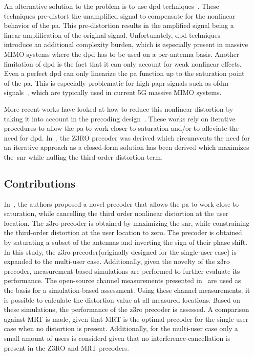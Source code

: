 \documentclass[conference]{IEEEtran}
\newcommand{\update}[1]{{#1}}
\newcommand{\zero}[0]{\gls{z3ro}\xspace}
\newcommand{\zerop}[0]{\zero precoder\xspace}
\begin{document}
An alternative solution to the problem is to use \gls{dpd} techniques~\cite{pa_for_wireless}. These techniques pre-distort the unamplified signal to compensate for the nonlinear behavior of the \gls{pa}. This pre-distortion results in the amplified signal being a linear amplification of the original signal. Unfortunately, \gls{dpd} techniques introduce an additional complexity burden, which is especially present in massive MIMO systems where the \gls{dpd} has to be used on a per-antenna basis. Another limitation of \gls{dpd} is the fact that it can only account for weak nonlinear effects. Even a perfect \gls{dpd} can only linearize the \gls{pa} function up to the saturation point of the \gls{pa}. This is especially problematic for high \gls{papr} signals such as \gls{ofdm} signals~\cite{ofdm_papr}, which are typically used in current 5G massive MIMO systems. 

\update{More recent works have looked at how to reduce this nonlinear distortion by taking it into account in the precoding design~\cite{distortion-aware, distortion-cancellation, efficient_precoding_undr_pa_nonlins}. These works rely on iterative procedures to allow the \gls{pa} to work closer to saturation and/or to alleviate the need for \gls{dpd}. In~\cite{z3ro}, the Z3RO precoder was derived which circumvents the need for an iterative approach as a closed-form solution has been derived which maximizes the~\gls{snr} while nulling the third-order distortion term.}

\subsection{Contributions}
In~\cite{z3ro}, the authors proposed a novel precoder that allows the \gls{pa} to work close to saturation, while cancelling the third order nonlinear distortion at the user location. The \acrlong{z3ro} precoder is obtained by maximizing the \gls{snr}, while constraining the third-order distortion at the user location to zero. The precoder is obtained by saturating a subset of the antennas and inverting the sign of their phase shift. \update{In this study, the \zerop (originally designed for the single-user case) is expanded to the multi-user case. Additionally, given the novelty of the \zerop, measurement-based simulations are performed to further evaluate its performance.} The open-source channel measurements presented in~\cite{measurements} are used as the basis for a simulation-based assessment. Using these channel measurements, it is possible to calculate the distortion value at all measured locations. \update{Based on these simulations, the performance of the \zerop is assessed. A comparison against MRT is made, given that MRT is the optimal precoder for the single-user case when no distortion is present. Additionally, for the multi-user case only a small amount of users is considerd given that no interference-cancellation is present in the Z3RO and MRT precoders.}  
\end{document}
